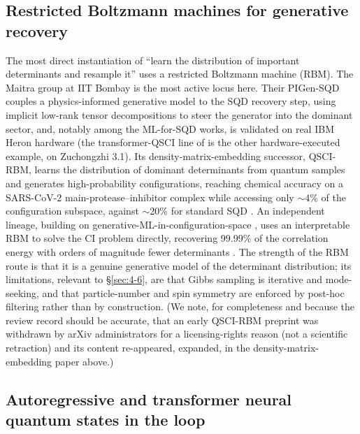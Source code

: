 \documentclass[onecolumn,a4paper]{quantumarticle}
\begin{document}
\subsection{Restricted Boltzmann machines for generative recovery}\label{sec:4-2}

The most direct instantiation of ``learn the distribution of important determinants and resample it'' uses a restricted Boltzmann machine (RBM). The Maitra group at IIT Bombay is the most active locus here. Their PIGen-SQD couples a physics-informed generative model to the SQD recovery step, using implicit low-rank tensor decompositions to steer the generator into the dominant sector, and, notably among the ML-for-SQD works, is validated on real IBM Heron hardware \cite{patra2025} (the transformer-QSCI line of \cite{zeng2026} is the other hardware-executed example, on Zuchongzhi 3.1). Its density-matrix-embedding successor, QSCI-RBM, learns the distribution of dominant determinants from quantum samples and generates high-probability configurations, reaching chemical accuracy on a SARS-CoV-2 main-protease--inhibitor complex while accessing only $\sim$4\% of the configuration subspace, against $\sim$20\% for standard SQD \cite{patra2026}. An independent lineage, building on generative-ML-in-configuration-space \cite{herzog2022}, uses an interpretable RBM to solve the CI problem directly, recovering 99.99\% of the correlation energy with orders of magnitude fewer determinants \cite{hernandezmartinez2025}. The strength of the RBM route is that it is a genuine generative model of the determinant distribution; its limitations, relevant to \S\ref{sec:4-6}, are that Gibbs sampling is iterative and mode-seeking, and that particle-number and spin symmetry are enforced by post-hoc filtering rather than by construction. (We note, for completeness and because the review record should be accurate, that an early QSCI-RBM preprint was withdrawn by arXiv administrators for a licensing-rights reason (not a scientific retraction) and its content re-appeared, expanded, in the density-matrix-embedding paper above.)


\subsection{Autoregressive and transformer neural quantum states in the loop}\label{sec:4-3}
\end{document}
